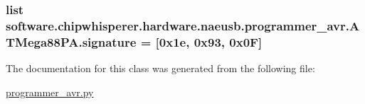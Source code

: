 \subsubsection[{signature}]{\setlength{\rightskip}{0pt plus 5cm}list software.\+chipwhisperer.\+hardware.\+naeusb.\+programmer\+\_\+avr.\+A\+T\+Mega88\+P\+A.\+signature = \mbox{[}0x1e, 0x93, 0x0\+F\mbox{]}\hspace{0.3cm}{\ttfamily [static]}}\label{classsoftware_1_1chipwhisperer_1_1hardware_1_1naeusb_1_1programmer__avr_1_1ATMega88PA_a0e3412ed434488062014bba19ef137bc}


The documentation for this class was generated from the following file\+:\begin{DoxyCompactItemize}
\item 
\hyperlink{programmer__avr_8py}{programmer\+\_\+avr.\+py}\end{DoxyCompactItemize}

